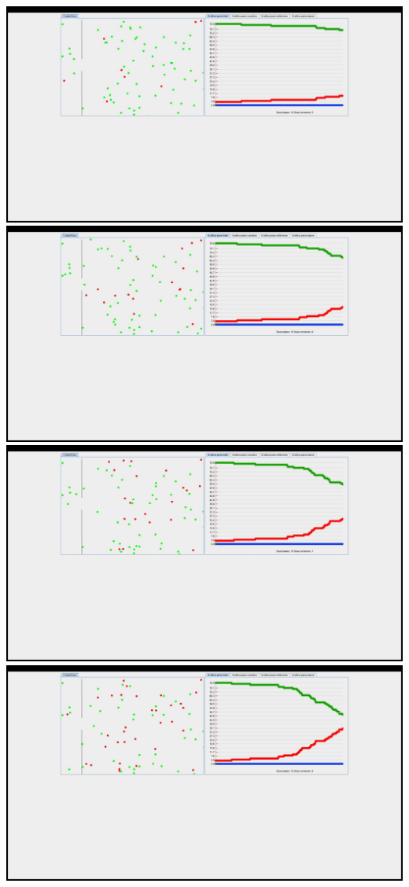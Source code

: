 \documentclass{report}
\begin{document}
\includegraphics[scale=0.20]{5}
\includegraphics[scale=0.20]{6}
\includegraphics[scale=0.20]{7}
\includegraphics[scale=0.20]{8}
\end{document}

